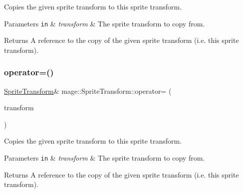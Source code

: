 Copies the given sprite transform to this sprite transform.


\begin{DoxyParams}[1]{Parameters}
\mbox{\tt in}  & {\em transform} & The sprite transform to copy from. \\
\hline
\end{DoxyParams}
\begin{DoxyReturn}{Returns}
A reference to the copy of the given sprite transform (i.\+e. this sprite transform). 
\end{DoxyReturn}
\hypertarget{structmage_1_1_sprite_transform_a9278d3fd0a6d346b188515b67a1adfc2}{}\label{structmage_1_1_sprite_transform_a9278d3fd0a6d346b188515b67a1adfc2} 
\subsubsection{\texorpdfstring{operator=()}{operator=()}\hspace{0.1cm}{\footnotesize\ttfamily [2/2]}}
{\footnotesize\ttfamily \hyperlink{structmage_1_1_sprite_transform}{Sprite\+Transform}\& mage\+::\+Sprite\+Transform\+::operator= (\begin{DoxyParamCaption}\item[{\hyperlink{structmage_1_1_sprite_transform}{Sprite\+Transform} \&\&}]{transform }\end{DoxyParamCaption})\hspace{0.3cm}{\ttfamily [default]}}

Copies the given sprite transform to this sprite transform.


\begin{DoxyParams}[1]{Parameters}
\mbox{\tt in}  & {\em transform} & The sprite transform to copy from. \\
\hline
\end{DoxyParams}
\begin{DoxyReturn}{Returns}
A reference to the copy of the given sprite transform (i.\+e. this sprite transform). 
\end{DoxyReturn}
\hypertarget{structmage_1_1_sprite_transform_a25096a75c5b2fbb08b771b14567cc16e}{}\label{structmage_1_1_sprite_transform_a25096a75c5b2fbb08b771b14567cc16e} 
